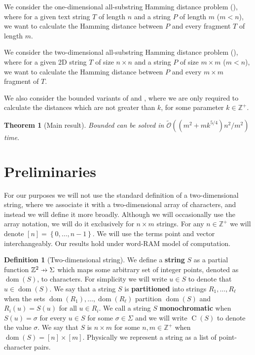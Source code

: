 \documentclass[11pt]{article}
\newcommand{\Z}{\mathbb{Z}}
\newcommand{\tO}{\tilde{\mathcal{O}}}
\newcommand{\set}[1]{\left\lbrace #1 \right\rbrace}
\theoremstyle{plain}
\newtheorem{theorem}{Theorem}
\theoremstyle{definition}
\newtheorem{definition}{Definition}
\theoremstyle{remark}
\DeclareMathOperator*{\dom}{dom}
\DeclareMathOperator*{\charrr}{C}
\begin{document}
We consider the one-dimensional all-substring Hamming distance problem (\hd), where for a given text string $T$ of length $n$ and a string $P$ of length $m$ ($m < n$), we want to calculate the Hamming distance between $P$ and every fragment $T$ of length $m$.

We consider the two-dimensional all-substring Hamming distance problem (\HD), where for a given 2D string $T$ of size $n \times n$ and a string $P$ of size $m \times m$ ($m < n$), we want to calculate the Hamming distance between $P$ and every $m \times m$ fragment of $T$.

We also consider the bounded variants of \hd and \HD, where we are only required to calculate the distances which are not greater than $k$, for some parameter $k \in \Z^+$.


\begin{theorem}[Main result]\label{main result}
	Bounded \HD can be solved in $\tO((m^2 + mk^{5/4})n^2 / m^2)$ time.
\end{theorem}


\section{Preliminaries}

For our purposes we will not use the standard definition of a two-dimensional string, where we associate it with a two-dimensional array of characters, and instead we will define it more broadly.
Although we will occasionally use the array notation, we will do it exclusively for $n \times m$ strings.
For any $n \in \Z^+$ we will denote $[n] = \set{0, \dots, n - 1}$.
We will use the terms point and vector interchangeably.
Our results hold under word-RAM model of computation.

\newcommand{\getchar}[1]{\charrr(#1)}
\newcommand{\pto}{\mathrel{\ooalign{\hfil$\mapstochar\mkern5mu$\hfil\cr$\to$\cr}}}
\renewcommand{\d}[1]{\dom(#1)}
\newcommand{\f}[1]{#1^\mathbf{f}}
\begin{definition}[Two-dimensional string]
	We define a \textbf{string} $S$ as a partial function $\Z^2 \pto \Sigma$ which maps some arbitrary set of integer points, denoted as $\d{S}$, to characters.
	For simplicity we will write $u \in S$ to denote that $u \in \d{S}$.
	We say that a string $S$ is \textbf{partitioned} into strings $R_1, \dots, R_\ell$ when the sets $\d{R_1}, \dots, \d{R_\ell}$ partition $\d{S}$ and $R_i(u) = S(u)$ for all $u \in R_i$.
	We call a string $S$ \textbf{monochromatic} when $S(u) = \sigma$ for every $u \in S$ for some $\sigma \in \Sigma$ and we will write $\getchar{S}$ to denote the value $\sigma$.
	We say that $S$ is $n \times m$ for some $n, m \in \Z^+$ when $\d{S} = [n] \times [m]$.
	Physically we represent a string as a list of point-character pairs.
\end{definition}
\end{document}
